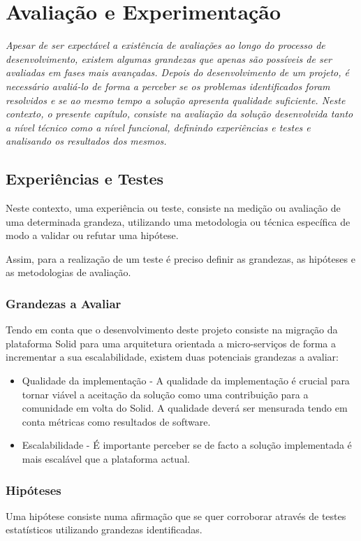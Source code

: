 
\chapter{Avaliação e Experimentação}
\label{cap:6}
\emph{
Apesar de ser expectável a existência de avaliações ao longo do processo de desenvolvimento, existem algumas grandezas que apenas são possíveis de ser avaliadas em fases mais avançadas. 
Depois do desenvolvimento de um projeto, é necessário avaliá-lo de forma a perceber se os problemas identificados foram resolvidos e se ao mesmo tempo a solução apresenta qualidade suficiente.
Neste contexto, o presente capítulo, consiste na avaliação da solução desenvolvida tanto a nível técnico como a nível funcional, definindo experiências e testes e analisando os resultados dos mesmos.}

\section{Experiências e Testes}
Neste contexto, uma experiência ou teste, consiste na medição ou avaliação de uma determinada grandeza, utilizando uma metodologia ou técnica específica de modo a validar ou refutar uma hipótese.

Assim, para a realização de um teste é preciso definir as grandezas, as hipóteses e as metodologias de avaliação.

\subsection{Grandezas a Avaliar}
Tendo em conta que o desenvolvimento deste projeto consiste na migração da plataforma Solid para uma arquitetura orientada a micro-serviços de forma a incrementar a sua escalabilidade, existem duas potenciais grandezas a avaliar:
\begin{itemize}
    \item Qualidade da implementação - A qualidade da implementação é crucial para tornar viável a aceitação da solução como uma contribuição para a comunidade em volta do Solid. A qualidade deverá ser mensurada tendo em conta métricas como resultados de software.
    \item Escalabilidade - É importante perceber se de facto a solução implementada é mais escalável que a plataforma actual.
\end{itemize}

\subsection{Hipóteses}
Uma hipótese consiste numa afirmação que se quer corroborar através de testes estatísticos utilizando grandezas identificadas.

